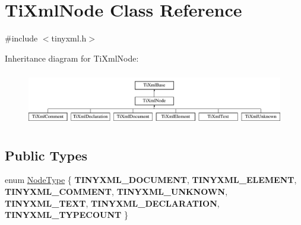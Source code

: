 \hypertarget{classTiXmlNode}{\section{\-Ti\-Xml\-Node \-Class \-Reference}
\label{classTiXmlNode}
}


{\ttfamily \#include $<$tinyxml.\-h$>$}

\-Inheritance diagram for \-Ti\-Xml\-Node\-:\begin{figure}[H]
\begin{center}
\leavevmode
\includegraphics[height=2.413793cm]{classTiXmlNode}
\end{center}
\end{figure}
\subsection*{\-Public \-Types}
\begin{DoxyCompactItemize}
\item 
enum \hyperlink{classTiXmlNode_a836eded4920ab9e9ef28496f48cd95a2}{\-Node\-Type} \{ \*
{\bfseries \-T\-I\-N\-Y\-X\-M\-L\-\_\-\-D\-O\-C\-U\-M\-E\-N\-T}, 
{\bfseries \-T\-I\-N\-Y\-X\-M\-L\-\_\-\-E\-L\-E\-M\-E\-N\-T}, 
{\bfseries \-T\-I\-N\-Y\-X\-M\-L\-\_\-\-C\-O\-M\-M\-E\-N\-T}, 
{\bfseries \-T\-I\-N\-Y\-X\-M\-L\-\_\-\-U\-N\-K\-N\-O\-W\-N}, 
\*
{\bfseries \-T\-I\-N\-Y\-X\-M\-L\-\_\-\-T\-E\-X\-T}, 
{\bfseries \-T\-I\-N\-Y\-X\-M\-L\-\_\-\-D\-E\-C\-L\-A\-R\-A\-T\-I\-O\-N}, 
{\bfseries \-T\-I\-N\-Y\-X\-M\-L\-\_\-\-T\-Y\-P\-E\-C\-O\-U\-N\-T}
 \}
\end{DoxyCompactItemize}
